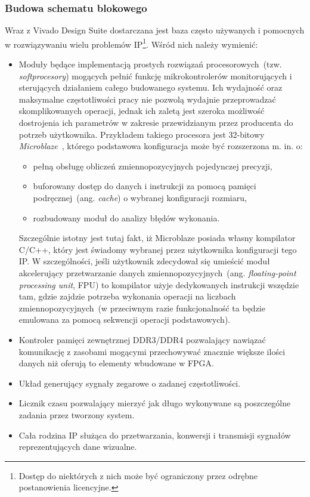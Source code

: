 \subsubsection{Budowa schematu blokowego}
Wraz z Vivado Design Suite dostarczana jest baza często używanych i pomocnych w rozwiązywaniu wielu problemów IP\footnote{Dostęp do niektórych z nich może być ograniczony przez odrębne postanowienia licencyjne.}. Wśród nich należy wymienić:
\begin{itemize}
\item Moduły będące implementacją prostych rozwiązań procesorowych~(tzw. \textit{softprocesory}) mogących pełnić funkcję mikrokontrolerów monitorujących i sterujących działaniem całego budowanego systemu. Ich wydajność oraz maksymalne częstotliwości pracy nie pozwolą wydajnie przeprowadzać skomplikowanych operacji, jednak ich zaletą jest szeroka możliwość dostrojenia ich parametrów w zakresie przewidzianym przez producenta do potrzeb użytkownika. Przykładem takiego procesora jest 32-bitowy  \textit{Microblaze}~\cite{MB_QUICK}\cite{MB_UG984}, którego podstawowa konfiguracja może być rozszerzona m. in. o:
\begin{itemize}
\item pełną obsługę obliczeń zmiennopozycyjnych pojedynczej precyzji,
\item buforowany dostęp do danych i instrukcji za pomocą pamięci podręcznej~(ang. \textit{cache}) o wybranej konfiguracji rozmiaru,
\item rozbudowany moduł do analizy błędów wykonania.
\end{itemize}
Szczególnie istotny jest tutaj fakt, iż Microblaze posiada własny kompilator C/C++, który jest świadomy wybranej przez użytkownika konfiguracji tego IP. W szczególności, jeśli użytkownik zdecydował się umieścić moduł akcelerujący przetwarzanie danych zmiennopozycyjnych~(ang. \textit{floating-point processing unit}, FPU) to kompilator użyje dedykowanych instrukcji wszędzie tam, gdzie zajdzie potrzeba wykonania operacji na liczbach zmiennopozycyjnych~(w przeciwnym razie funkcjonalność ta będzie emulowana za pomocą sekwencji operacji podstawowych).
\item Kontroler pamięci zewnętrznej DDR3/DDR4 pozwalający nawiązać komunikację z zasobami mogącymi przechowywać znacznie większe ilości danych niż oferują to elementy wbudowane w FPGA.
\item Układ generujący sygnały zegarowe o zadanej częstotliwości.
\item Licznik czasu pozwalający mierzyć jak długo wykonywane są poszczególne zadania przez tworzony system.
\item Cała rodzina IP służąca do przetwarzania, konwersji i transmisji sygnałów reprezentujących dane wizualne.
\end{itemize}
